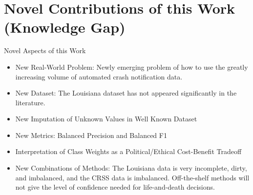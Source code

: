 \section{Novel Contributions of this Work (Knowledge Gap)}

Novel Aspects of this Work

\begin{itemize}
	\item New Real-World Problem:  Newly emerging problem of how to use the greatly increasing volume of automated crash notification data.
	\item New Dataset:  The Louisiana dataset has not appeared significantly in the literature.
	\item New Imputation of Unknown Values in Well Known Dataset
	\item New Metrics:  Balanced Precision and Balanced F1
	\item Interpretation of Class Weights as a Political/Ethical Cost-Benefit Tradeoff
	\item New Combinations of Methods:  The Louisiana data is very incomplete, dirty, and imbalanced, and the CRSS data is imbalanced.  Off-the-shelf methods will not give the level of confidence needed for life-and-death decisions.  
\end{itemize}